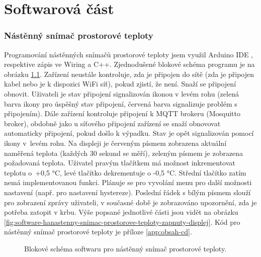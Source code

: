 \chapter{Softwarová část}

\subsection{Nástěnný snímač prostorové teploty}
Programování nástěnných snímačů prostorové teploty jsem využil Arduino IDE \cite{arduino-ide}, respektive zápis ve Wiring a C++. Zjednodušené blokové schéma programu je na obrázku \ref{fig:blokove-schema-nastenny-snimac-prostorove-teploty-ethernet}. Zařízení neustále kontroluje, zda je připojen do sítě (zda je připojen kabel nebo je k dispozici WiFi síť), pokud zjistí, že není. Snaží se připojení obnovit. Uživateli je stav připojení signalizován ikonou v levém rohu (zelená barva ikony pro úspěšný stav připojení, červená barva signalizuje problém s připojením). Dále zařízení kontroluje připojení k MQTT brokeru (Mosquitto broker), obdobně jako u síťového připojení zařízení se snaží obnovovat automaticky připojení, pokud došlo k výpadku. Stav je opět signalizován pomocí ikony v~levém rohu. Na displeji je červeným písmem zobrazena aktuální naměřená teplota (každých 30 sekund se měří), zeleným písmem je zobrazena požadovaná teplota. Uživatel pravým tlačítkem má možnost inkrementovat teplotu o~+0,5 °C, levé tlačítko dekrementuje o -0,5 °C. Střední tlačítko zatím nemá implementovanou funkci. Plánuje se pro vyvolání menu pro další možnosti nastavení (např. pro nastavení hystereze). Poslední řádek s bílým písmem slouží pro zobrazení zprávy uživateli, v současné době je zobrazováno upozornění, zda je potřeba zatopit v krbu. Výše popsané jednotlivé části jsou vidět na obrázku \ref{fig:software-hanastenny-snimac-prostorove-teploty-zapnuty-displej}. Kód pro nástěnný snímač prostorové teploty je příloze \ref{app:obsah-cd}.

\begin{figure}[H]
    \centering
    \def\svgwidth{\columnwidth}
    
    \caption{Blokové schéma softwaru pro nástěnný snímač prostorové teploty.}
    \label{fig:blokove-schema-nastenny-snimac-prostorove-teploty-ethernet}
\end{figure}

